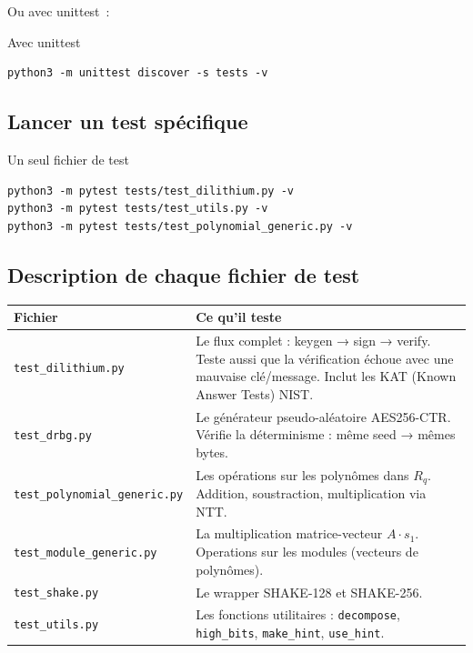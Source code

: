 \documentclass[12pt, a4paper]{article}
\begin{document}
Ou avec unittest~:
\begin{cmdbox}{Avec unittest}
\begin{lstlisting}[style=bash]
python3 -m unittest discover -s tests -v
\end{lstlisting}
\end{cmdbox}

\subsection{Lancer un test spécifique}

\begin{cmdbox}{Un seul fichier de test}
\begin{lstlisting}[style=bash]
python3 -m pytest tests/test_dilithium.py -v
python3 -m pytest tests/test_utils.py -v
python3 -m pytest tests/test_polynomial_generic.py -v
\end{lstlisting}
\end{cmdbox}

\subsection{Description de chaque fichier de test}

\begin{center}
\begin{tabular}{lp{9cm}}
\toprule
\textbf{Fichier} & \textbf{Ce qu'il teste} \\
\midrule
\texttt{test\_dilithium.py} &
  Le flux complet : keygen → sign → verify.
  Teste aussi que la vérification échoue avec une mauvaise clé/message.
  Inclut les KAT (Known Answer Tests) NIST. \\
\addlinespace
\texttt{test\_drbg.py} &
  Le générateur pseudo-aléatoire AES256-CTR.
  Vérifie la déterminisme : même seed → mêmes bytes. \\
\addlinespace
\texttt{test\_polynomial\_generic.py} &
  Les opérations sur les polynômes dans $R_q$.
  Addition, soustraction, multiplication via NTT. \\
\addlinespace
\texttt{test\_module\_generic.py} &
  La multiplication matrice-vecteur $A \cdot s_1$.
  Operations sur les modules (vecteurs de polynômes). \\
\addlinespace
\texttt{test\_shake.py} &
  Le wrapper SHAKE-128 et SHAKE-256. \\
\addlinespace
\texttt{test\_utils.py} &
  Les fonctions utilitaires : \texttt{decompose},
  \texttt{high\_bits}, \texttt{make\_hint}, \texttt{use\_hint}. \\
\bottomrule
\end{tabular}
\end{center}
\end{document}
